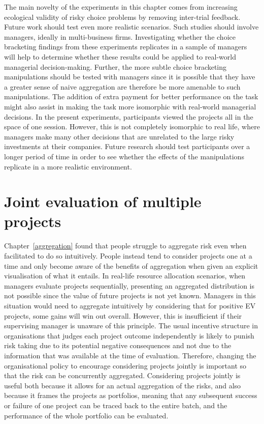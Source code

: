 \documentclass[a4paper, nobind, dvipsnames]{templates/ociamthesis}
\theoremstyle{definition}
\theoremstyle{definition}
\theoremstyle{definition}
\theoremstyle{definition}
\theoremstyle{remark}
\begin{document}
The main novelty of the experiments in this chapter comes from increasing
ecological validity of risky choice problems by removing inter-trial feedback.
Future work should test even more realistic scenarios. Such studies should
involve managers, ideally in multi-business firms. Investigating whether the
choice bracketing findings from these experiments replicates in a sample of
managers will help to determine whether these results could be applied to
real-world managerial decision-making. Further, the more subtle choice
bracketing manipulations should be tested with managers since it is possible
that they have a greater sense of naive aggregation are therefore be more
amenable to such manipulations. The addition of extra payment for better
performance on the task might also assist in making the task more isomorphic
with real-world managerial decisions. In the present experiments, participants
viewed the projects all in the space of one session. However, this is not
completely isomorphic to real life, where managers make many other decisions
that are unrelated to the large risky investments at their companies. Future
research should test participants over a longer period of time in order to see
whether the effects of the manipulations replicate in a more realistic
environment.

\newpage

\printbibliography[segment=\therefsegment,heading=subbibintoc]

\hypertarget{interstitial-1}{%
\chapter{Joint evaluation of multiple projects}\label{interstitial-1}}

Chapter~\ref{aggregation} found that people struggle to aggregate risk even
when facilitated to do so intuitively. People instead tend to consider projects
one at a time and only become aware of the benefits of aggregation when given an
explicit visualisation of what it entails. In real-life resource allocation
scenarios, when managers evaluate projects sequentially, presenting an
aggregated distribution is not possible since the value of future projects is
not yet known. Managers in this situation would need to aggregate intuitively by
considering that for positive EV projects, some gains will win out overall.
However, this is insufficient if their supervising manager is unaware of this
principle. The usual incentive structure in organisations that judges each
project outcome independently is likely to punish risk taking due to its
potential negative consequences and not due to the information that was
available at the time of evaluation. Therefore, changing the organisational
policy to encourage considering projects jointly is important so that the risk
can be concurrently aggregated. Considering projects jointly is useful both
because it allows for an actual aggregation of the risks, and also because it
frames the projects as portfolios, meaning that any subsequent success or
failure of one project can be traced back to the entire batch, and the
performance of the whole portfolio can be evaluated.
\end{document}
